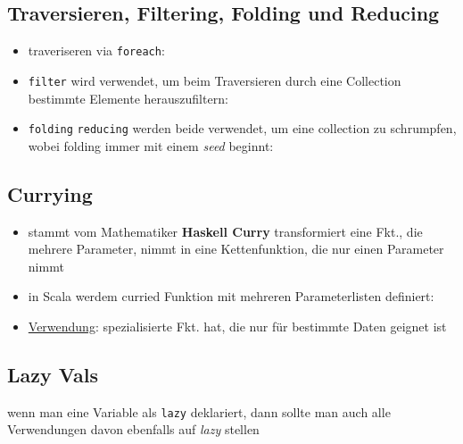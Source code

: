 \subsection{Traversieren, Filtering, Folding und Reducing}
\begin{itemize}
  \item traveriseren via \texttt{foreach}:
  
  
    
  \item \texttt{filter} wird verwendet, um beim Traversieren durch eine
  Collection bestimmte Elemente herauszufiltern:
  
  
  
  \item \texttt{folding} \und \texttt{reducing} werden beide verwendet, um
  eine collection zu schrumpfen, wobei folding immer mit einem 
  \textit{seed} beginnt:
  
    
\end{itemize}


\subsection{Currying}
\begin{itemize}
  \item stammt vom Mathematiker \textbf{Haskell Curry} \und transformiert
  eine Fkt., die mehrere Parameter, nimmt in eine Kettenfunktion, die 
  nur einen Parameter nimmt
  \item in Scala werdem curried Funktion mit mehreren Parameterlisten
  definiert:
  
  
  
  \item \uline{Verwendung}: spezialisierte Fkt. hat, die nur für 
  bestimmte Daten geignet ist
\end{itemize}


\subsection{Lazy Vals}
wenn man eine Variable als \texttt{lazy} deklariert, dann sollte
man auch alle Verwendungen davon ebenfalls auf \textit{lazy} stellen 

 
\pagebreak


